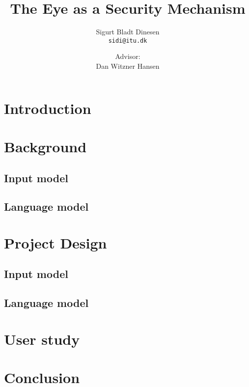 \documentclass[a4paper, titlepage]{article}
\renewcommand{\%}{\scalebox{.9}{\oldpct}}
\begin{document}
\title{The Eye as a Security Mechanism}
\author{
	Sigurt Bladt Dinesen
	\\\texttt{sidi@itu.dk}
	\and
	Advisor:
	\\Dan Witzner Hansen
}


\maketitle
\tableofcontents
\clearpage
\section{Introduction}

\section{Background}
\subsection{Input model}
\subsection{Language model}

\section{Project Design}
\subsection{Input model}
\subsection{Language model}

\section{User study}
\section{Conclusion}
\end{document}
